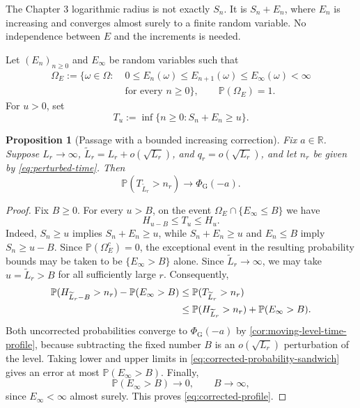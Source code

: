 \documentclass[10pt,reqno,a4paper]{amsart}
\numberwithin{equation}{section}
\theoremstyle{plain}
\newtheorem{proposition}[theorem]{Proposition}
\theoremstyle{definition}
\theoremstyle{remark}
\newcommand{\R}{\mathbb{R}}
\newcommand{\Pp}{\mathbb{P}}
\newcommand{\1}{\mathbf{1}}
\begin{document}
The Chapter 3 logarithmic radius is not exactly $S_n$.  It is $S_n+E_n$,
where $E_n$ is increasing and converges almost surely to a finite random
variable.  No independence between $E$ and the increments is needed.

Let $(E_n)_{n\geq0}$ and $E_\infty$ be random variables such that
\begin{equation}\label{eq:correction-assumptions}
  \begin{split}
    \Omega_E:=\{\omega\in\Omega:\;&
      0\leq E_n(\omega)\leq E_{n+1}(\omega)
        \leq E_\infty(\omega)<\infty\\
      &\text{for every }n\geq0\},
      \qquad \Pp(\Omega_E)=1.
  \end{split}
\end{equation}
For $u>0$, set
\begin{equation}\label{eq:corrected-hitting-time}
  T_u:=\inf\{n\geq0:S_n+E_n\geq u\}.
\end{equation}

\begin{proposition}[Passage with a bounded increasing correction]
\label{prop:corrected-passage}
  Fix $a\in\R$.  Suppose $L_r\to\infty$,
  $\widetilde L_r=L_r+o(\sqrt{L_r})$, and
  $q_r=o(\sqrt{L_r})$, and let $n_r$ be given by
  \cref{eq:perturbed-time}.  Then
  \begin{equation}\label{eq:corrected-profile}
    \Pp(T_{\widetilde L_r}>n_r)
    \longrightarrow
    \Phi_{\mathrm G}(-a).
  \end{equation}
\end{proposition}

\begin{proof}
  Fix $B\geq0$.  For every $u>B$, on the event
  $\Omega_E\cap\{E_\infty\leq B\}$ we have
  \begin{equation}\label{eq:corrected-sandwich}
    H_{u-B}\leq T_u\leq H_u.
  \end{equation}
  Indeed, $S_n\geq u$ implies $S_n+E_n\geq u$, while
  $S_n+E_n\geq u$ and $E_n\leq B$ imply $S_n\geq u-B$.
  Since $\Pp(\Omega_E^c)=0$, the exceptional event in the resulting
  probability bounds may be taken to be $\{E_\infty>B\}$ alone.
  Since $\widetilde L_r\to\infty$, we may take
  $u=\widetilde L_r>B$ for all sufficiently large $r$.  Consequently,
  \begin{align}\label{eq:corrected-probability-sandwich}
    \Pp(H_{\widetilde L_r-B}>n_r)-\Pp(E_\infty>B)
    &\leq \Pp(T_{\widetilde L_r}>n_r)\notag\\
    &\leq
    \Pp(H_{\widetilde L_r}>n_r)+\Pp(E_\infty>B).
  \end{align}
  Both uncorrected probabilities converge to
  $\Phi_{\mathrm G}(-a)$ by
  \cref{cor:moving-level-time-profile}, because subtracting the fixed number
  $B$ is an $o(\sqrt{L_r})$ perturbation of the level.  Taking lower and upper
  limits in \cref{eq:corrected-probability-sandwich} gives an error at most
  $\Pp(E_\infty>B)$.  Finally,
  \begin{equation*}
    \Pp(E_\infty>B)\longrightarrow0,
    \qquad B\longrightarrow\infty,
  \end{equation*}
  since $E_\infty<\infty$ almost surely.  This proves
  \cref{eq:corrected-profile}.
\end{proof}
\end{document}
